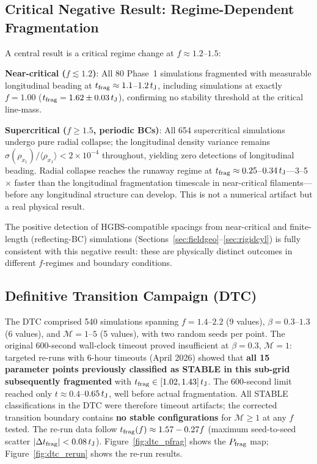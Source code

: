 \documentclass[twoside,twocolumn]{mnras}
\begin{document}
\subsection{Critical Negative Result: Regime-Dependent Fragmentation}
\label{sec:critnat}

A central result is a critical regime change at $f \approx 1.2$--$1.5$:

\textbf{Near-critical ($f \lesssim 1.2$)}: All 80 Phase~1 simulations fragmented with
measurable longitudinal beading at $t_{\rm frag} \approx 1.1$--$1.2\,t_{\rm J}$,
including simulations at exactly $f = 1.00$ ($t_{\rm frag} = 1.62 \pm 0.03\,t_{\rm J}$),
confirming no stability threshold at the critical line-mass.

\textbf{Supercritical ($f \geq 1.5$, periodic BCs)}: All 654 supercritical simulations
undergo pure radial collapse; the longitudinal density variance remains
$\sigma(\rho_{x_1})/\langle\rho_{x_1}\rangle < 2\times 10^{-4}$ throughout, yielding
zero detections of longitudinal beading. Radial collapse reaches the runaway regime
at $t_{\rm frag} \approx 0.25$--$0.34\,t_{\rm J}$---3--5$\times$ faster than the
longitudinal fragmentation timescale in near-critical filaments---before any longitudinal
structure can develop. This is not a numerical artifact but a real physical result.

The positive detection of HGBS-compatible spacings from near-critical and finite-length
(reflecting-BC) simulations (Sections~\ref{sec:fieldgeo}--\ref{sec:rigidcyl}) is fully
consistent with this negative result: these are physically distinct outcomes in
different $f$-regimes and boundary conditions.

\subsection{Definitive Transition Campaign (DTC)}
\label{sec:dtc}

The DTC comprised 540 simulations spanning $f = 1.4$--$2.2$ (9 values),
$\beta = 0.3$--$1.3$ (6 values), and $\mathcal{M} = 1$--$5$ (5 values), with
two random seeds per point. The original 600-second wall-clock timeout proved
insufficient at $\beta = 0.3$, $\mathcal{M} = 1$: targeted re-runs with
6-hour timeouts (April 2026) showed that \textbf{all 15 parameter points
previously classified as STABLE in this sub-grid subsequently fragmented}
with $t_{\rm frag} \in [1.02, 1.43]\,t_{\rm J}$. The 600-second limit reached
only $t \approx 0.4$--$0.65\,t_{\rm J}$, well before actual fragmentation.
All STABLE classifications in the DTC were therefore timeout artifacts; the corrected
transition boundary contains \textbf{no stable configurations} for $\mathcal{M} \geq 1$
at any $f$ tested. The re-run data follow $t_{\rm frag}(f) \approx 1.57 - 0.27f$
(maximum seed-to-seed scatter $|\Delta t_{\rm frag}| < 0.08\,t_{\rm J}$).
Figure~\ref{fig:dtc_pfrag} shows the $P_{\rm frag}$ map; Figure~\ref{fig:dtc_rerun}
shows the re-run results.
\end{document}
